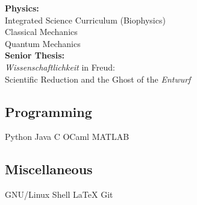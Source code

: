 \documentclass[a4paper]{MagicalCV}
\begin{document}
\begin{minipage}[t]{0.33\textwidth}
\textbf{Physics:} \\
Integrated Science Curriculum (Biophysics) \\
Classical Mechanics \\
Quantum Mechanics \\

\textbf{Senior Thesis:} \\
\textit{Wissenschaftlichkeit} in Freud: \\
Scientific Reduction and the Ghost of the \textit{Entwurf}
\sectionsep


\subsection{Programming}
Python \textbullet{} Java \textbullet{} C \textbullet{} OCaml \textbullet{} MATLAB
\sectionsep


\subsection{Miscellaneous}
GNU/Linux \textbullet{} Shell \textbullet{} \LaTeX \textbullet{} Git
\sectionsep

\end{minipage} 
\hfill
\end{document}
